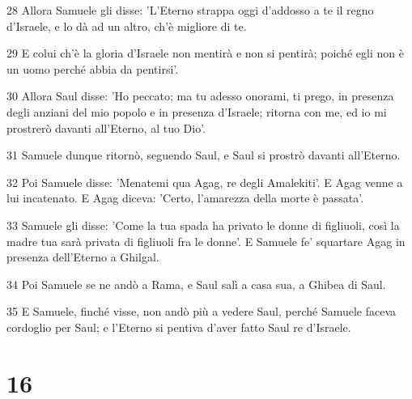 \par 28 Allora Samuele gli disse: 'L'Eterno strappa oggi d'addosso a te il regno d'Israele, e lo dà ad un altro, ch'è migliore di te.
\par 29 E colui ch'è la gloria d'Israele non mentirà e non si pentirà; poiché egli non è un uomo perché abbia da pentirsi'.
\par 30 Allora Saul disse: 'Ho peccato; ma tu adesso onorami, ti prego, in presenza degli anziani del mio popolo e in presenza d'Israele; ritorna con me, ed io mi prostrerò davanti all'Eterno, al tuo Dio'.
\par 31 Samuele dunque ritornò, seguendo Saul, e Saul si prostrò davanti all'Eterno.
\par 32 Poi Samuele disse: 'Menatemi qua Agag, re degli Amalekiti'. E Agag venne a lui incatenato. E Agag diceva: 'Certo, l'amarezza della morte è passata'.
\par 33 Samuele gli disse: 'Come la tua spada ha privato le donne di figliuoli, così la madre tua sarà privata di figliuoli fra le donne'. E Samuele fe' squartare Agag in presenza dell'Eterno a Ghilgal.
\par 34 Poi Samuele se ne andò a Rama, e Saul salì a casa sua, a Ghibea di Saul.
\par 35 E Samuele, finché visse, non andò più a vedere Saul, perché Samuele faceva cordoglio per Saul; e l'Eterno si pentiva d'aver fatto Saul re d'Israele.

\chapter{16}

